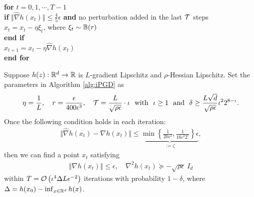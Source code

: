 \begin{algorithm*}[htbp]  
\caption{Inexact Perturbed Gradient Descent} \label{alg:iPGD}
\begin{algorithmic}[1] 
\STATE \textbf{for} $t = 0,1,\cdots,T-1$ \\
\STATE \quad \textbf{if} $ \Vert \hat \nabla h(x_t) \Vert \le \frac{4}{5} \epsilon$ \textbf{and} no perturbation added in the last ${\mathcal{T}}$ steps \\[1mm]
\STATE \quad \quad $x_{t} = x_t - \eta \xi_t $, where $\xi_t \sim {\mathbb{B}}(r)$ \\[1mm]
\STATE \quad \textbf{end if} \\[1mm]
\STATE \quad $x_{t+1} = x_t -  \eta  \hat \nabla h(x_t)$ \\[1mm]
\STATE \textbf{end for} \\[1mm]
\end{algorithmic}
\end{algorithm*}

\begin{thm}
    \label{thm:iPGD}
Suppose $h(z): {\mathbb{R}}^d \rightarrow {\mathbb{R}}$ is
$L$-gradient Lipschitz and $\rho$-Hessian Lipschitz. 
Set the parameters in Algorithm \ref{alg:iPGD} as 
\begin{align} \label{cond:iota}
    \eta = \frac{1}{L}, \quad r = \frac{\epsilon}{400 \iota^3}, \quad {\mathcal{T}} = \frac{L}{\sqrt{\rho \epsilon}} \cdot \iota ~~{\rm with }~~ \iota \ge 1 ~~ {\rm and} ~~ \delta \ge  \frac{L \sqrt{d}}{\sqrt{\rho \epsilon}} \iota^2 2^{8-\iota}.
\end{align}
Once the following condition holds in each
iteration:
\begin{align} \label{cond:PF2BA}
    \Vert \hat \nabla h(x_t) - \nabla h(x_t) \Vert \le \underbrace{\min \left\{ 
    \frac{1}{20 \iota^2},  \frac{1}{16 \iota^2 2^{\iota}} \right\} \epsilon}_{:=\zeta},
\end{align}
then we can find a point $x_t$ satisfying
\begin{align*}
    \Vert \nabla h(x_t) \Vert \le \epsilon, \quad  \nabla^2 h(x_t)  \succeq - \sqrt{\rho \epsilon}~ I_{d}
\end{align*}
within $T= {\mathcal{O}} \left( {\iota^4  \Delta L}{\epsilon^{-2}}   \right)$ iterations with probability $1-\delta$, where
$\Delta = h(x_0) - \inf_{x \in {\mathbb{R}}^{d}} h(x)$.    
\end{thm}


